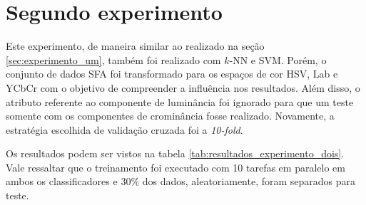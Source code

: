 \section{Segundo experimento}
\label{sec:experimento_dois}
Este experimento, de maneira similar ao realizado na seção \ref{sec:experimento_um}, também foi realizado com $k$-NN e SVM. Porém, o conjunto de dados SFA foi transformado para os espaços de cor HSV, Lab e YCbCr com o objetivo de compreender a influência nos resultados. Além disso, o atributo referente ao componente de luminância foi ignorado para que um teste somente com os componentes de crominância fosse realizado. Novamente, a estratégia escolhida de validação cruzada foi a \emph{10-fold}.

Os resultados podem ser vistos na tabela \ref{tab:resultados_experimento_dois}. Vale ressaltar que o treinamento foi executado com 10 tarefas em paralelo em ambos os classificadores e 30\% dos dados, aleatoriamente, foram separados para teste.
